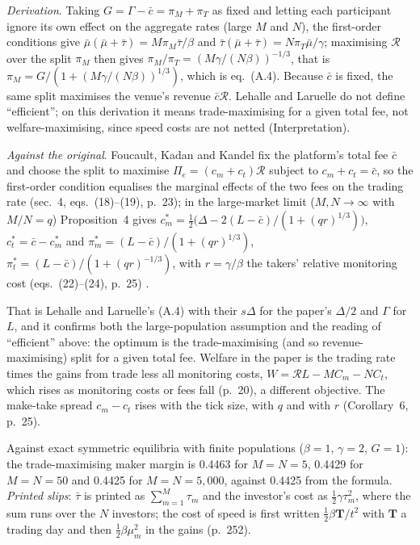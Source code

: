 \begin{qfmodel}
 \emph{Derivation}. Taking $G=\Gamma-\bar c=\pi_M+\pi_T$ as fixed and letting each participant ignore its own effect on the aggregate rates (large $M$ and $N$), the first-order conditions give $\bar\mu(\bar\mu+\bar\tau)=M\pi_M\bar\tau/\beta$ and $\bar\tau(\bar\mu+\bar\tau)=N\pi_T\bar\mu/\gamma$; maximising $\mathcal R$ over the split $\pi_M$ then gives $\pi_M/\pi_T=(M\gamma/(N\beta))^{-1/3}$, that is $\pi_M=G/(1+(M\gamma/(N\beta))^{1/3})$, which is eq.~(A.4). Because $\bar c$ is fixed, the same split maximises the venue's revenue $\bar c\mathcal R$. Lehalle and Laruelle do not define ``efficient''; on this derivation it means trade-maximising for a given total fee, not welfare-maximising, since speed costs are not netted (Interpretation).

\emph{Against the original}. Foucault, Kadan and Kandel fix the platform's total fee $\bar c$ and choose the split to maximise $\Pi_e=(c_m+c_t)\mathcal R$ subject to $c_m+c_t=\bar c$, so the first-order condition equalises the marginal effects of the two fees on the trading rate (sec.~4, eqs.~(18)--(19), p.~23); in the large-market limit ($M,N\to\infty$ with $M/N=q$) Proposition~4 gives $c_m^*=\tfrac12\bigl(\Delta-2(L-\bar c)/(1+(qr)^{1/3})\bigr)$, $c_t^*=\bar c-c_m^*$ and $\pi_m^*=(L-\bar c)/(1+(qr)^{1/3})$, $\pi_t^*=(L-\bar c)/(1+(qr)^{-1/3})$, with $r=\gamma/\beta$ the takers' relative monitoring cost (eqs.~(22)--(24), p.~25) \citep[working paper, September 2009]{fkk-2009}.

That is Lehalle and Laruelle's (A.4) with their $s\Delta$ for the paper's $\Delta/2$ and $\Gamma$ for $L$, and it confirms both the large-population assumption and the reading of ``efficient'' above: the optimum is the trade-maximising (and so revenue-maximising) split for a given total fee. Welfare in the paper is the trading rate times the gains from trade less all monitoring costs, $W=\mathcal R L-MC_m-NC_t$, which rises as monitoring costs or fees fall (p.~20), a different objective. The make-take spread $c_m-c_t$ rises with the tick size, with $q$ and with $r$ (Corollary~6, p.~25).

Against exact symmetric equilibria with finite populations ($\beta=1$, $\gamma=2$, $G=1$): the trade-maximising maker margin is 0.4463 for $M=N=5$, 0.4429 for $M=N=50$ and 0.4425 for $M=N=5{,}000$, against 0.4425 from the formula. \emph{Printed slips}: $\bar\tau$ is printed as $\sum_{m=1}^{M}\tau_m$ and the investor's cost as $\frac12\gamma\tau_m^2$, where the sum runs over the $N$ investors; the cost of speed is first written $\frac12\beta\mathbf T/t^2$ with $\mathbf T$ a trading day and then $\frac12\beta\mu_m^2$ in the gains (p.~252).


\end{qfmodel}
